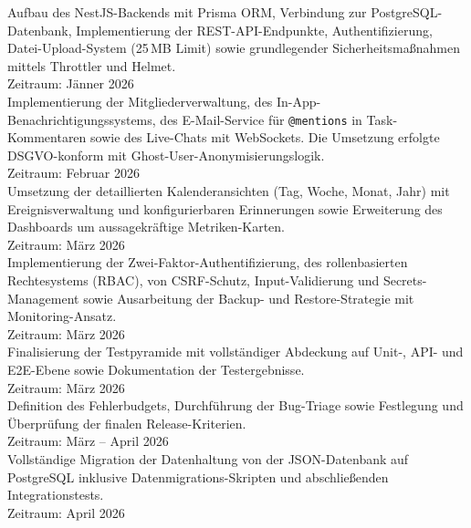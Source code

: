 Aufbau des NestJS-Backends mit Prisma ORM, Verbindung zur PostgreSQL-Datenbank, Implementierung der REST-API-Endpunkte, Authentifizierung, Datei-Upload-System (25\,MB Limit) sowie grundlegender Sicherheitsmaßnahmen mittels Throttler und Helmet.\\
Zeitraum: Jänner 2026\\
 
Implementierung der Mitgliederverwaltung, des In-App-Benachrichtigungssystems, des E-Mail-Service für \texttt{@mentions} in Task-Kommentaren sowie des Live-Chats mit WebSockets. Die Umsetzung erfolgte DSGVO-konform mit Ghost-User-Anonymisierungslogik.\\
Zeitraum: Februar 2026\\
 
Umsetzung der detaillierten Kalenderansichten (Tag, Woche, Monat, Jahr) mit Ereignisverwaltung
und konfigurierbaren Erinnerungen sowie Erweiterung des Dashboards um aussagekräftige Metriken-Karten.\\
Zeitraum: März 2026\\
 
Implementierung der Zwei-Faktor-Authentifizierung, des rollenbasierten Rechtesystems (RBAC),
von CSRF-Schutz, Input-Validierung und Secrets-Management sowie Ausarbeitung der Backup-
und Restore-Strategie mit Monitoring-Ansatz.\\
Zeitraum: März 2026\\
 
Finalisierung der Testpyramide mit vollständiger Abdeckung auf Unit-, API- und E2E-Ebene
sowie Dokumentation der Testergebnisse.\\
Zeitraum: März 2026\\
 
Definition des Fehlerbudgets, Durchführung der Bug-Triage sowie Festlegung und Überprüfung
der finalen Release-Kriterien.\\
Zeitraum: März -- April 2026\\
 
Vollständige Migration der Datenhaltung von der JSON-Datenbank auf PostgreSQL inklusive
Datenmigrations-Skripten und abschließenden Integrationstests.\\
Zeitraum: April 2026\\
 

